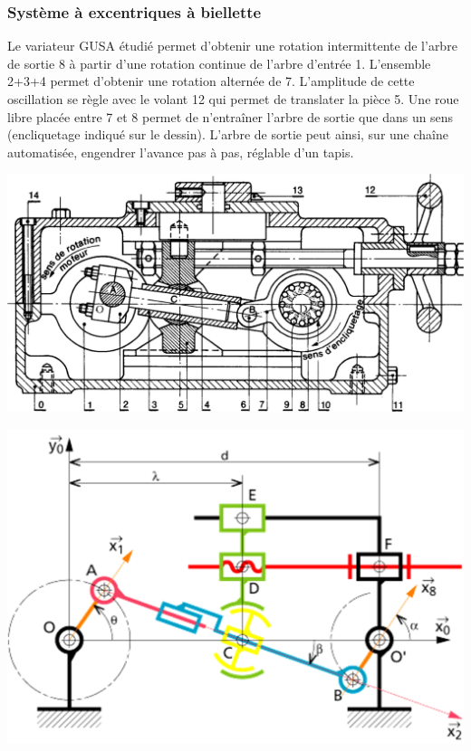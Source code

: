 \documentclass[11pt,oneside]{article}
\begin{document}
\subsubsection{Système à excentriques à biellette}
Le variateur GUSA étudié permet d’obtenir une rotation intermittente de l’arbre de sortie 8 à partir d’une rotation continue de l’arbre d’entrée 1.
L’ensemble 2+3+4 permet d’obtenir une rotation alternée de 7.
L’amplitude de cette oscillation se règle avec le volant 12 qui permet de translater la pièce 5.
Une roue libre placée entre 7 et 8 permet de n’entraîner l’arbre de sortie que dans un sens (encliquetage indiqué sur le dessin).
L’arbre de sortie peut ainsi, sur une chaîne automatisée, engendrer l’avance pas à pas, réglable d’un tapis.

\begin{minipage}[c]{.47\linewidth}
\begin{center}
\includegraphics[width=.95\textwidth]{png/fig_122}
\end{center}
\end{minipage}\hfill
\begin{minipage}[c]{.47\linewidth}
\begin{center}
\includegraphics[width=.95\textwidth]{png/fig_123}
\end{center}
\end{minipage}
\end{document}
